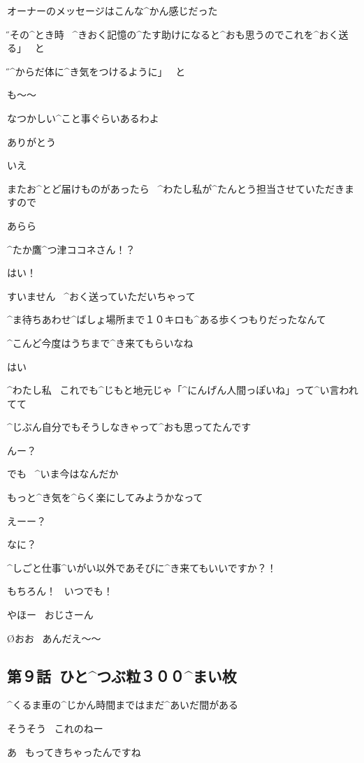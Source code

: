 \A オーナーのメッセージはこんな^{かん}{感}じだった

\page
\H 「その^{とき}{時}
\ ^{きおく}{記憶}の^{たす}{助}けになると^{おも}{思}うのでこれを^{おく}{送}る」
\ と

\H 「^{からだ}{体}に^{き}{気}をつけるように」
\ と

\A も〜〜

\A なつかしい^{こと}{事}ぐらいあるわよ

\page
\A ありがとう

\K いえ

\K またお^{とど}{届}けものがあったら
\ ^{わたし}{私}が^{たんとう}{担当}させていただきますので

\A あらら

\A ^{たか}{鷹}^{つ}{津}ココネさん！？

\K はい！

\page
\K すいません
\ ^{おく}{送}っていただいちゃって

\A ^{ま}{待}ちあわせ^{ばしょ}{場所}まで１０キロも^{ある}{歩}くつもりだったなんて

\A ^{こんど}{今度}はうちまで^{き}{来}てもらいなね

\K はい

\page
\K ^{わたし}{私}
\ これでも^{じもと}{地元}じゃ「^{にんげん}{人間}っぽいね」って^{い}{言}われてて

\K ^{じぶん}{自分}でもそうしなきゃって^{おも}{思}ってたんです

\A んー？

\K でも
\ ^{いま}{今}はなんだか

\K もっと^{き}{気}を^{らく}{楽}にしてみようかなって

\A えーー？

\A なに？

\page
\K ^{しごと}{仕事}^{いがい}{以外}であそびに^{き}{来}てもいいですか？！

\A もちろん！
\ いつでも！

\A やほー
\ おじさーん

\O おお
\ あんだえ〜〜


\subsection{第９話\ ひと^{つぶ}{粒}３００^{まい}{枚}}

\page[20]
\A ^{くるま}{車}の^{じかん}{時間}まではまだ^{あいだ}{間}がある

\page
\A そうそう
\ これのねー

\K あ
\ もってきちゃったんですね

